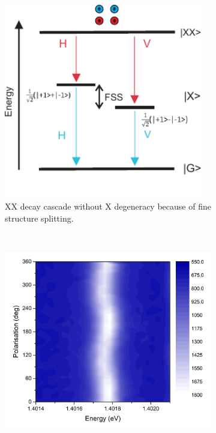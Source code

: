\begin{figure}[H]
	\centering
	\begin{subfigure}[b]{0.48\textwidth}
		\centering
		\includegraphics[width=0.95\textwidth]{figures/quantum-dot/QD_EnergyLevels_FSS.pdf}
		\caption{XX decay cascade without X degeneracy because of fine structure splitting.~\cite{huber_gaas_2019}\\}
		\label{fig:qd-energy-levels-fss}
	\end{subfigure}%
	~ %
	\begin{subfigure}[b]{0.48\textwidth}
		\centering
		\includegraphics[width=1.05\textwidth]{figures/quantum-dot/FSS_Pol.png}

\end{subfigure}
\end{figure}
